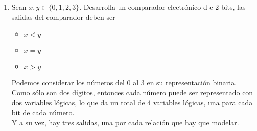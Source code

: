 \documentclass{article}
\begin{document}
\begin{enumerate}
{        }
        \item {
            Sean $x, y \in \{0, 1, 2, 3\}$. Desarrolla un comparador electrónico d
            e 2 bits, las salidas del comparador deben ser
            \begin{itemize}
                \item {
                    $x<y$
                }
                \item {
                    $x=y$
                }
                \item {
                    $x>y$
                }
            \end{itemize}
            Podemos considerar los números del 0 al 3 en su representación 
            binaria. Como sólo son dos dígitos, entonces cada número puede ser 
            representado con dos variables lógicas, lo que da un total de 4 
            variables lógicas, una para cada bit de cada número. \\
            Y a su vez, hay tres salidas, una por cada relación que hay que 
            modelar.

}
\end{enumerate}
\end{document}
